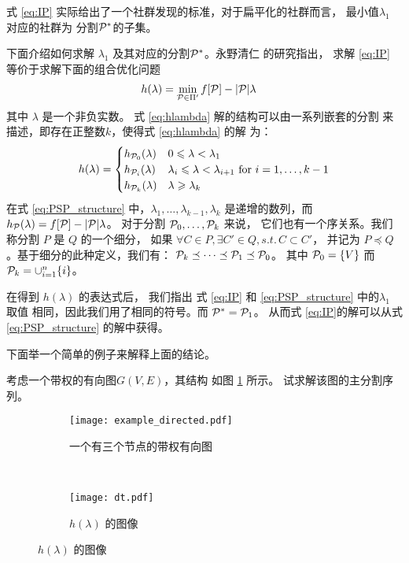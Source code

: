 式 \eqref{eq:IP} 实际给出了一个社群发现的标准，对于扁平化的社群而言，
最小值$\lambda_1$ 对应的社群为
分割$\P^*$的子集。

下面介绍如何求解 $\lambda_1$ 及其对应的分割$\P^*$。永野清仁 \cite{mac} 的研究指出，
求解 \eqref{eq:IP} 等价于求解下面的组合优化问题
\begin{align}\label{eq:hlambda}
  h(\lambda) &= \min_{\P \in \Pi'} f[\P] - \abs{\P} \lambda 
  \end{align}
其中 $\lambda$ 是一个非负实数。
式 \eqref{eq:hlambda} 解的结构可以由一系列嵌套的分割
来描述，即存在正整数$k$，使得式 \eqref{eq:hlambda} 的解
为：
\begin{equation}\label{eq:PSP_structure}
  h(\lambda) = \begin{cases} h_{\P_0}(\lambda) & 0\leq \lambda < \lambda_1 \\
  h_{\P_i}(\lambda) & \lambda_i \leq \lambda < \lambda_{i+1} \textrm{ for } i = 1, \dots, k-1 \\
  h_{\P_k}(\lambda) & \lambda \geq \lambda_k
  \end{cases}
\end{equation}
在式 \eqref{eq:PSP_structure} 中，$\lambda_1, \dots, \lambda_{k-1},
\lambda_k$ 是递增的数列，而 $h_{\P}(\lambda)=f[\P]-|\P|\lambda$。
对于分割 $\P_0, \dots, \P_k$ 来说，
它们也有一个序关系。我们称分割 $P$ 是 $Q$ 的一个细分，
如果 $\forall C \in P, \exists C' \in Q, s.t.\, C\subset C'$，
并记为 $P \preceq Q$。基于细分的此种定义，我们有：
$\P_k \preceq \dots \preceq \P_1 \preceq \P_0$。
其中 $\P_0=\{V\}$ 而 $\P_k=\cup_{i=1}^n \{ i\}$。

在得到 $h(\lambda)$ 的表达式后，
我们指出 式 \eqref{eq:IP} 和
\eqref{eq:PSP_structure} 中的$\lambda_1$ 取值
相同，因此我们用了相同的符号。而 $\P^*=\P_1$。
从而式 \eqref{eq:IP}的解可以从式 \eqref{eq:PSP_structure}
的解中获得。

下面举一个简单的例子来解释上面的结论。
\begin{example}\label{ex:psp}
考虑一个带权的有向图$G(V,E)$，其结构
如图 \ref{fig:example_directed} 所示。
试求解该图的主分割序列。
\end{example}
\begin{figure}
  \centering
  \begin{subfigure}[b]{0.5\linewidth}
  \texttt{[image: example\_directed.pdf]}
  \caption{一个有三个节点的带权有向图}
  \label{fig:example_directed}
  \end{subfigure}~
  \begin{subfigure}[b]{0.5\linewidth}
    \texttt{[image: dt.pdf]}
    \caption{$h(\lambda)$ 的图像}
    \label{fig:dt}
    \end{subfigure}  
\end{figure}

